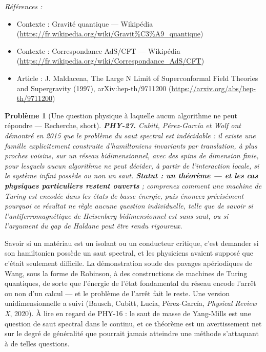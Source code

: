 \documentclass[11pt]{article}
\newtheorem{problem}{Problème}
\newenvironment{refs}{\par\small\noindent\emph{Références :}\begin{itemize}\setlength\itemsep{0pt}}{\end{itemize}\normalsize}
\begin{document}
\begin{refs}
\item Contexte : Gravité quantique --- Wikipédia (\url{https://fr.wikipedia.org/wiki/Gravit%C3%A9_quantique})
\item Contexte : Correspondance AdS/CFT --- Wikipédia (\url{https://fr.wikipedia.org/wiki/Correspondance_AdS/CFT})
\item Article : J. Maldacena, \og{} The Large N Limit of Superconformal Field Theories and Supergravity \fg{} (1997), arXiv:hep-th/9711200 (\url{https://arxiv.org/abs/hep-th/9711200})
\end{refs}

\bigskip

\begin{problem}[{Une question physique à laquelle aucun algorithme ne peut répondre --- Recherche, short}]
\textbf{PHY-27.} Cubitt, Pérez-García et Wolf ont démontré en 2015 que le
problème du saut spectral est indécidable : il existe une famille explicitement construite
d'hamiltoniens invariants par translation, à plus proches voisins, sur un réseau bidimensionnel,
avec des spins de dimension finie, pour lesquels aucun algorithme ne peut décider, à partir de
l'interaction locale, si le système infini possède ou non un saut. \textbf{Statut : un théorème --- et les
cas physiques particuliers restent ouverts} ; comprenez comment une machine de Turing est
encodée dans les états de basse énergie, puis énoncez précisément pourquoi ce résultat ne règle
aucune question individuelle, telle que de savoir si l'antiferromagnétique de Heisenberg
bidimensionnel est sans saut, ou si l'argument du gap de Haldane peut être rendu rigoureux.
\end{problem}

\noindent Savoir si un matériau est un isolant ou un conducteur critique, c'est demander
si son hamiltonien possède un saut spectral, et les physiciens avaient supposé que c'était
seulement difficile. La démonstration soude des pavages apériodiques de Wang, sous la forme de
Robinson, à des constructions de machines de Turing quantiques, de sorte que l'énergie de l'état
fondamental du réseau encode l'arrêt ou non d'un calcul --- et le problème de l'arrêt fait le reste.
Une version unidimensionnelle a suivi (Bausch, Cubitt, Lucia, Pérez-García, \textit{Physical Review
X}, 2020). À lire en regard de PHY-16 : le saut de masse de Yang-Mills est une question de saut
spectral dans le continu, et ce théorème est un avertissement net sur le degré de généralité que
pourrait jamais atteindre une méthode s'attaquant à de telles questions.
\end{document}
